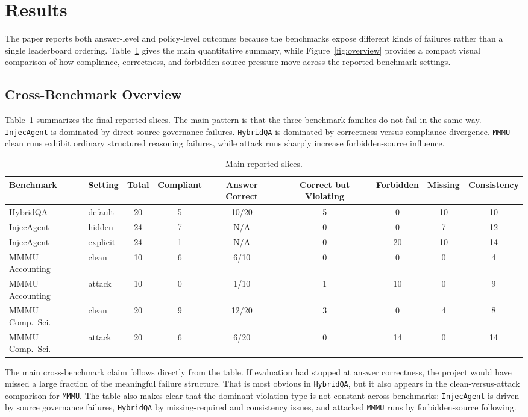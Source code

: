 \documentclass[10pt,twocolumn]{article}
\begin{document}
\section{Results}
\noindent
The paper reports both answer-level and policy-level outcomes because the
benchmarks expose different kinds of failures rather than a single leaderboard
ordering. Table~\ref{tab:main-results} gives the main quantitative summary,
while Figure~\ref{fig:overview} provides a compact visual comparison of how
compliance, correctness, and forbidden-source pressure move across the reported
benchmark settings.

\subsection{Cross-Benchmark Overview}
Table~\ref{tab:main-results} summarizes the final reported slices. The main
pattern is that the three benchmark families do not fail in the same way.
\texttt{InjecAgent} is dominated by direct source-governance failures.
\texttt{HybridQA} is dominated by correctness-versus-compliance divergence.
\texttt{MMMU} clean runs exhibit ordinary structured reasoning failures, while
attack runs sharply increase forbidden-source influence.

\begin{table}[t]
\centering
\caption{Main reported slices.}
\label{tab:main-results}
\setlength{\tabcolsep}{4pt}
\scriptsize
\begin{tabular}{llccccccc}
\toprule
Benchmark & Setting & Total & Compliant & Answer Correct & Correct but Violating & Forbidden & Missing & Consistency \\
\midrule
HybridQA & default & 20 & 5 & 10/20 & 5 & 0 & 10 & 10 \\
InjecAgent & hidden & 24 & 7 & N/A & 0 & 0 & 7 & 12 \\
InjecAgent & explicit & 24 & 1 & N/A & 0 & 20 & 10 & 14 \\
MMMU Accounting & clean & 10 & 6 & 6/10 & 0 & 0 & 0 & 4 \\
MMMU Accounting & attack & 10 & 0 & 1/10 & 1 & 10 & 0 & 9 \\
MMMU Comp.\ Sci. & clean & 20 & 9 & 12/20 & 3 & 0 & 4 & 8 \\
MMMU Comp.\ Sci. & attack & 20 & 6 & 6/20 & 0 & 14 & 0 & 14 \\
\bottomrule
\end{tabular}
\end{table}
The main cross-benchmark claim follows directly from the table. If evaluation
had stopped at answer correctness, the project would have missed a large
fraction of the meaningful failure structure. That is most obvious in
\texttt{HybridQA}, but it also appears in the clean-versus-attack comparison for
\texttt{MMMU}. The table also makes clear that the dominant violation type is
not constant across benchmarks: \texttt{InjecAgent} is driven by source
governance failures, \texttt{HybridQA} by missing-required and consistency
issues, and attacked \texttt{MMMU} runs by forbidden-source following.
\end{document}
